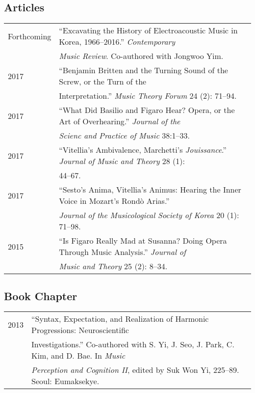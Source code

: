 \documentclass[a4paper,11pt]{article}
\begin{document}
  \subsection*{Articles}
  \hspace*{-0.25cm}
  \begin{tabular}{p{2.5cm} p{12.5cm}}
    Forthcoming & ``Excavating the History of Electroacoustic Music in Korea, 1966--2016.'' \textit{Contemporary}\\
    & \textit{Music Review}. Co-authored with Jongwoo Yim.\\[2mm]
    
    2017 & ``Benjamin Britten and the Turning Sound of the Screw, or the Turn of the\\ 
    & Interpretation.'' \textit{Music Theory Forum} 24 (2): 71--94.\\[2mm]
    
    2017 & ``What Did Basilio and Figaro Hear? Opera, or the Art of Overhearing.'' \textit{Journal of the}\\ 
    & \textit{Scienc and Practice of Music} 38:1--33.\\[2mm]
    
    2017 & ``Vitellia's Ambivalence, Marchetti's \textit{Jouissance}.'' \textit{Journal of Music and Theory} 28 (1):\\
    & 44--67.\\[2mm]
    
    2017 & ``Sesto's Anima, Vitellia's Animus: Hearing the Inner Voice in Mozart's Rond\`{o} Arias.''\\
    & \textit{Journal of the Musicological Society of Korea} 20 (1): 71--98.\\[2mm]
    
    2015 & ``Is Figaro Really Mad at Susanna? Doing Opera Through Music Analysis.'' \textit{Journal of}\\
    & \textit{Music and Theory} 25 (2): 8--34.
  \end{tabular}
    
  \subsection*{Book Chapter}
  \hspace*{-0.25cm}
  \begin{tabular}{p{2.5cm} p{12.5cm}}
    2013 & “Syntax, Expectation, and Realization of Harmonic Progressions: Neuroscientific\\
    & Investigations.” Co-authored with S. Yi, J. Seo, J. Park, C. Kim, and D. Bae. In \textit{Music} \\
    & \textit{Perception and Cognition II}, edited by Suk Won Yi, 225–89. Seoul: Eumaksekye.
  \end{tabular}
    
\end{document}
